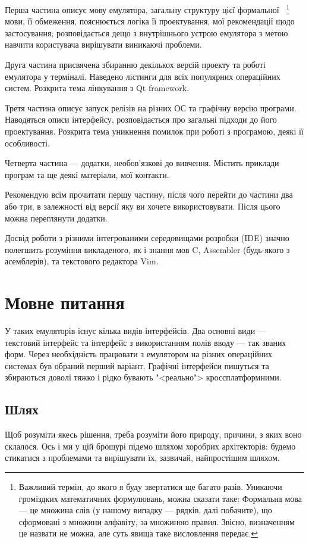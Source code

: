 \documentclass[oneside,final,14pt]{extreport}
\begin{document}
Перша частина описує мову емулятора, загальну структуру цієї формальної~
\footnote{Важливий термін, до якого я буду звертатися ще багато разів. Уникаючи громіздких математичних формулювань, можна сказати таке: Формальна мова --- це множина слів (у нашому випадку --- рядків, далі побачите), що сформовані з множини алфавіту, за множиною правил. Звісно, визначенням це назвати не можна, але суть явища таке висловлення передає.}
мови, її обмеження, пояснюється логіка її проектування, мої рекомендації щодо застосування; розповідається дещо з внутрішнього устрою емулятора з метою навчити користувача вирішувати виникаючі проблеми.

Друга частина присвячена збиранню декількох версій проекту та роботі емулятора у терміналі. Наведено лістинги для всіх популярних операційних систем. Розкрита тема лінкування з Qt framework.

Третя частина описує запуск релізів на різних ОС та графічну версію програми. Наводяться описи інтерфейсу, розповідається про загальні підходи до його проектування. Розкрита тема уникнення помилок при роботі з програмою, деякі її особливості.

Четверта частина --- додатки, необов'язкові до вивчення. Містить приклади програм та ще деякі матеріали, мої контакти.
\bigskip 

Рекомендую всім прочитати першу частину, після чого перейти до частини два або три, в залежності від версії яку ви хочете використовувати. Після цього можна переглянути додатки.

Досвід роботи з різними інтегрованими середовищами розробки (IDE) значно полегшить розуміння викладеного, як і знання мов C, Assembler (будь-якого з асемблерів), та текстового редактора Vim.

\chapter{Мовне питання}
У таких емуляторів існує кілька видів інтерфейсів. Два основні види --- текстовий інтерфейс та інтерфейс з використанням полів вводу --- так званих форм. Через необхідність працювати з емулятором на різних операційних системах був обраний перший варіант. Графічні інтерфейси пишуться та збираються доволі тяжко і рідко бувають "<реально"> кроссплатформними.
\section{Шлях}
Щоб розуміти якесь рішення, треба розуміти його природу, причини, з яких воно склалося. Ось і ми у цій брошурі підемо шляхом хоробрих архітекторів: будемо стикатися з проблемами та вирішувати їх, зазвичай, найпростішим шляхом.
\end{document}
